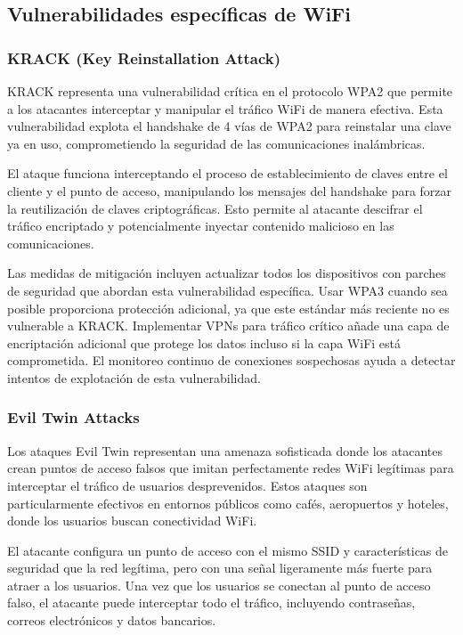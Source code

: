 \subsection{Vulnerabilidades específicas de WiFi}

\subsubsection{KRACK (Key Reinstallation Attack)}

KRACK representa una vulnerabilidad crítica en el protocolo WPA2 que permite a los atacantes interceptar y manipular el tráfico WiFi de manera efectiva. Esta vulnerabilidad explota el handshake de 4 vías de WPA2 para reinstalar una clave ya en uso, comprometiendo la seguridad de las comunicaciones inalámbricas.

El ataque funciona interceptando el proceso de establecimiento de claves entre el cliente y el punto de acceso, manipulando los mensajes del handshake para forzar la reutilización de claves criptográficas. Esto permite al atacante descifrar el tráfico encriptado y potencialmente inyectar contenido malicioso en las comunicaciones.

Las medidas de mitigación incluyen actualizar todos los dispositivos con parches de seguridad que abordan esta vulnerabilidad específica. Usar WPA3 cuando sea posible proporciona protección adicional, ya que este estándar más reciente no es vulnerable a KRACK. Implementar VPNs para tráfico crítico añade una capa de encriptación adicional que protege los datos incluso si la capa WiFi está comprometida. El monitoreo continuo de conexiones sospechosas ayuda a detectar intentos de explotación de esta vulnerabilidad.

\subsubsection{Evil Twin Attacks}

Los ataques Evil Twin representan una amenaza sofisticada donde los atacantes crean puntos de acceso falsos que imitan perfectamente redes WiFi legítimas para interceptar el tráfico de usuarios desprevenidos. Estos ataques son particularmente efectivos en entornos públicos como cafés, aeropuertos y hoteles, donde los usuarios buscan conectividad WiFi.

El atacante configura un punto de acceso con el mismo SSID y características de seguridad que la red legítima, pero con una señal ligeramente más fuerte para atraer a los usuarios. Una vez que los usuarios se conectan al punto de acceso falso, el atacante puede interceptar todo el tráfico, incluyendo contraseñas, correos electrónicos y datos bancarios.

